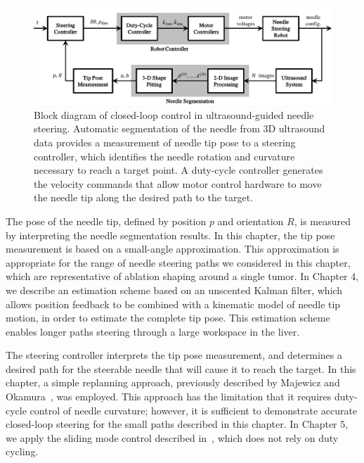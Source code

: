 \begin{figure}[!t]
\centering
\includegraphics[width=\columnwidth]{Images/Chapter2/ControlBlockDiagram/ControlBlockDiagram}%
\caption[Block diagram of closed-loop control algorithm]{Block diagram of closed-loop control in ultrasound-guided needle steering. Automatic segmentation of the needle from 3D ultrasound data provides a measurement of needle tip pose to a steering controller, which identifies the needle rotation and curvature necessary to reach a target point. A duty-cycle controller generates the velocity commands that allow motor control hardware to move the needle tip along the desired path to the target.}
\label{fig:ControlBlockDiagram}
\end{figure}

The pose of the needle tip, defined by position $p$ and orientation $R$, is measured by interpreting the needle segmentation results. In this chapter, the tip pose measurement is based on a small-angle approximation. This approximation is appropriate for the range of needle steering paths we considered in this chapter, which are representative of ablation shaping around a single tumor. In Chapter 4, we describe an estimation scheme based on an unscented Kalman filter, which allows position feedback to be combined with a kinematic model of needle tip motion, in order to estimate the complete tip pose. This estimation scheme enables longer paths steering through a large workspace in the liver. 

The steering controller interprets the tip pose measurement, and determines a desired path for the steerable needle that will cause it to reach the target. In this chapter, a simple replanning approach, previously described by Majewicz and Okamura~\cite{Majewicz2013}, was employed. This approach has the limitation that it requires duty-cycle control of needle curvature; however, it is sufficient to demonstrate accurate closed-loop steering for the small paths described in this chapter. In Chapter 5, we apply the sliding mode control described in~\cite{Rucker2013}, which does not rely on duty cycling.

